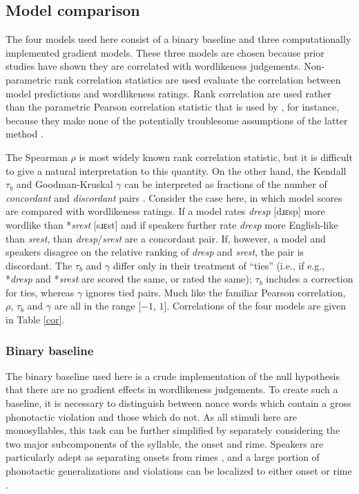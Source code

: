 \subsection{Model comparison}

The four models used here consist of a binary baseline and three computationally implemented gradient models. These three models are chosen because prior studies have shown they are correlated with wordlikeness judgements. Non-parametric rank correlation statistics are used evaluate the correlation between model predictions and wordlikeness ratings. Rank correlation are used rather than the parametric Pearson correlation statistic that is used by \citet{Hayes2008a}, for instance, because they make none of the potentially troublesome assumptions of the latter method \citep[see][23, fn. 12]{Albright2009a}.

The Spearman $\rho$ is most widely known rank correlation statistic, but it is difficult to give a natural interpretation to this quantity. On the other hand, the Kendall $\tau_b$ and Goodman-Kruskal $\gamma$ can be interpreted as fractions of the number of \emph{concordant} and \emph{discordant} pairs \citep{Noether1981}. Consider the case here, in which model scores are compared with wordlikeness ratings. If a model rates \emph{dresp} [dɹɛsp] more wordlike than *\emph{srest} [sɹɛst] and if speakers further rate \emph{dresp} more English-like than \emph{srest}, than \emph{dresp}/\emph{srest} are a concordant pair. If, however, a model and speakers disagree on the relative ranking of \emph{dresp} and \emph{srest}, the pair is discordant. The $\tau_b$ and $\gamma$ differ only in their treatment of ``ties'' (i.e., if e.g., *\emph{dresp} and *\emph{srest} are scored the same, or rated the same); $\tau_b$ includes a correction for ties, whereas $\gamma$ ignores tied pairs. Much like the familiar Pearson correlation, $\rho$, $\tau_b$ and $\gamma$ are all in the range [$-1$, $1$]. Correlations of the four models are given in Table \ref{cor}.

\subsubsection{Binary baseline}

The binary baseline used here is a crude implementation of the null hypothesis that there are no gradient effects in wordlikeness judgements. To create such a baseline, it is necessary to distinguish between nonce words which contain a gross phonotactic violation and those which do not. As all stimuli here are monosyllables, this task can be further simplified by separately considering the two major subcomponents of the syllable, the onset and rime. Speakers are particularly adept as separating onsets from rimes \citep{Treiman1986,Treiman1995,Fowler1993}, and a large portion of phonotactic generalizations and violations can be localized to either onset or rime \citep[e.g.,][]{Borowsky1989,Fudge1969,Treiman1995,Kessler1997,Treiman2000}.

